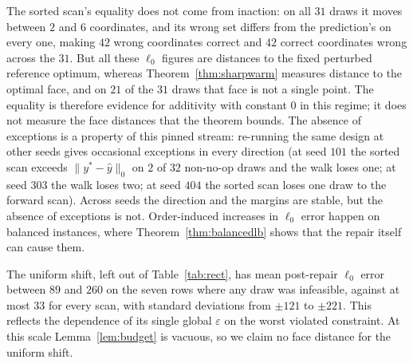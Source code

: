 The sorted scan's equality does not come from inaction: on all $31$ draws it moves between $2$ and
$6$ coordinates, and its wrong set differs from the prediction's on every one, making $42$ wrong
coordinates correct and $42$ correct coordinates wrong across the $31$. But all these $\ell_0$
figures are distances to the fixed perturbed reference optimum, whereas
Theorem~\ref{thm:sharpwarm} measures distance to the optimal face, and on $21$ of the $31$ draws that face is not a single
point. The equality is therefore evidence for additivity with constant $0$ in this regime; it does not
measure the face distances that the theorem bounds.
The absence of exceptions is a property of this pinned stream:
re-running the same design at other seeds gives occasional exceptions in every direction (at seed
$101$ the sorted scan exceeds $\|y^*-\hat y\|_0$ on $2$ of $32$ non-no-op draws and the walk loses
one; at seed $303$ the walk loses two; at seed $404$ the sorted scan loses one draw to the forward
scan). Across seeds the direction and the margins are stable, but the absence of exceptions is not.
Order-induced increases in $\ell_0$ error happen on balanced instances, where Theorem~\ref{thm:balancedlb}
shows that the repair itself can cause them.

The uniform shift, left out of Table~\ref{tab:rect}, has mean
post-repair $\ell_0$ error between $89$ and $260$ on the seven rows where any draw was
infeasible, against at most $33$ for every scan, with standard deviations from $\pm121$ to $\pm221$.
This reflects the dependence of its single global $\varepsilon$ on the worst violated constraint.
At this scale Lemma~\ref{lem:budget} is vacuous, so we claim no face distance for the uniform shift.


